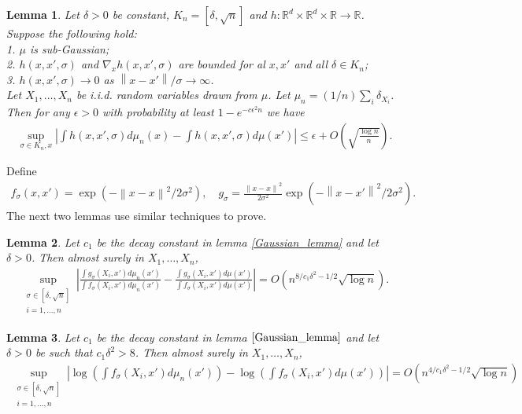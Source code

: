 \documentclass[10pt]{article}
\newcommand{\norm}[1]{\left\lVert#1\right\rVert}
\newtheorem{lemma}{\bf Lemma}
\newenvironment{Proof of lemma}{\noindent{\bf Proof of Lemma}}{\hfill$\Box$\newline}
\newenvironment{Proof of claim}{\noindent{\bf Proof of claim}}{\hfill$\Box$\newline}
\newenvironment{Proof of theorem}{\noindent{\bf Proof of Theorem}}{\hfill\scriptsize{$\Box$}\newline}
\newenvironment{Proof of theorems}{\noindent{\bf Proof of Theorems}}{\hfill$\Box$\newline}
\newenvironment{Proof of proposition}{\noindent{\bf Proof of Proposition}}{\hfill$\Box$\newline}
\newenvironment{Proof of propositions}{\noindent{\bf Proof of Propositions}}{\hfill$\Box$\newline}
\newenvironment{Proof of exercise}{\noindent{\it Proof of Exercise:}}{\hfill$\Box$}
\numberwithin{equation}{section}
\begin{document}
\begin{lemma} \label{approx_lemma}
    Let $\delta>0$ be constant, $K_n = [\delta,\sqrt{n}]$ and $h: \mathbb{R}^d \times \mathbb{R}^d \times \mathbb{R} \to \mathbb{R}$. Suppose the following hold: \\
    1. $\mu$ is sub-Gaussian; \\
    2. $h(x,x',\sigma)$ and $\nabla_x h(x,x',\sigma)$ are bounded for al $x,x'$ and all $\delta \in K_n$;\\
    3. $h(x,x',\sigma) \to 0$ as $\norm{x-x'}/\sigma \to \infty$.\\
    Let $X_1,\dots,X_n$ be i.i.d. random variables drawn from $\mu$. Let $\mu_n = (1/n)\sum_i \delta_{X_i}$. Then for any $\epsilon > 0$ with probability at least $1 - e^{-c\epsilon^2n}$ we have
    \begin{align}
        \sup_{\sigma \in K_n,x} \left|\int h(x,x',\sigma)d\mu_n(x) - \int h(x,x',\sigma)d\mu(x')\right| \leq \epsilon + O\left(\sqrt{\frac{\log n}{n}}\right).
    \end{align}
\end{lemma}
Define
\begin{align}
    f_{\sigma}(x,x') = \exp(-\norm{x-x}^2/2\sigma^2), \quad g_{\sigma} = \frac{\norm{x-x}^2}{2\sigma^2} \exp(-\norm{x-x'}^2/2\sigma^2).
\end{align}
The next two lemmas use similar techniques to prove.
\begin{lemma}
    Let $c_1$ be the decay constant in lemma \ref{Gaussian_lemma} and let $\delta >0$. Then almost surely in $X_1,\dots,X_n$,
    \begin{align}
        \sup_{\substack{\sigma \in [\delta, \sqrt{n}] \\ i = 1,\dots,n}}\left|\frac{\int g_{\sigma}(X_i,x')d\mu_n(x')}{\int f_{\sigma}(X_i,x')d\mu_n (x')} - \frac{\int g_{\sigma}(X_i,x')d\mu(x')}{\int f_{\sigma}(X_i,x')d\mu (x')}\right| = O(n^{8/c_1 \delta^2 -1/2}\sqrt{\log n}).
    \end{align}
\end{lemma}
\begin{lemma}\label{pair_lemma_2}
    Let $c_1$ be the decay constant in lemma $\ref{Gaussian_lemma}$ and let $\delta>0$ be such that $c_1\delta^2>8$. Then almost surely in $X_1,\dots,X_n$,
    \begin{align}
        \sup_{\substack{\sigma \in [\delta, \sqrt{n}] \\ i = 1,\dots,n}} \left|\log \left(\int f_{\sigma}(X_i,x')d\mu_n (x')\right) - \log \left(\int f_{\sigma}(X_i,x')d\mu (x')\right)\right| = O(n^{4/c_1\delta^2 -1/2}\sqrt{\log n})
    \end{align}
\end{lemma}
\end{document}
